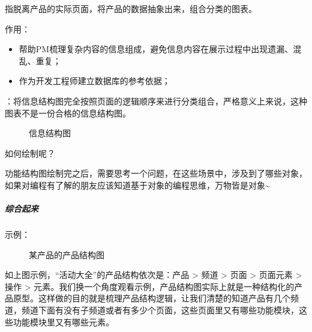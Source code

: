 \documentclass[letterpaper,10pt,english]{sphinxmanual}
\begin{document}
指脱离产品的实际页面，将产品的数据抽象出来，组合分类的图表。

作用：
\begin{itemize}
\item {} 
帮助PM梳理复杂内容的信息组成，避免信息内容在展示过程中出现遗漏、混乱、重复；

\item {} 
作为开发工程师建立数据库的参考依据；

\end{itemize}

：将信息结构图完全按照页面的逻辑顺序来进行分类组合，严格意义上来说，这种图表不是一份合格的信息结构图。%
\begin{footnote}[605]\sphinxAtStartFootnote
{}
%
\end{footnote}

\begin{figure}[H]
\centering
\capstart

\noindent{}
\caption{信息结构图}\label{\detokenize{chapter_knowledge/flow_chart:id50}}\end{figure}

如何绘制呢？

功能结构图绘制完之后，需要思考一个问题，在这些场景中，涉及到了哪些对象，如果对编程有了解的朋友应该知道基于对象的编程思维，万物皆是对象\textasciitilde{}%
\begin{footnote}[606]\sphinxAtStartFootnote
{}
%
\end{footnote}


\subparagraph{综合起来}
\label{\detokenize{chapter_knowledge/flow_chart:id36}}
示例：

\begin{figure}[H]
\centering
\capstart

\noindent{}
\caption{某产品的产品结构图}\label{\detokenize{chapter_knowledge/flow_chart:id51}}\end{figure}

如上图示例，“活动大全”的产品结构依次是：产品 \sphinxhyphen{}> 频道 \sphinxhyphen{}> 页面 \sphinxhyphen{}> 页面元素
\sphinxhyphen{}> 操作 \sphinxhyphen{}>
元素。我们换一个角度观看示例，产品结构图实际上就是一种结构化的产品原型。这样做的目的就是梳理产品结构逻辑，让我们清楚的知道产品有几个频道，频道下面有没有子频道或者有多少个页面，这些页面里又有哪些功能模块，这些功能模块里又有哪些元素。
\end{document}
